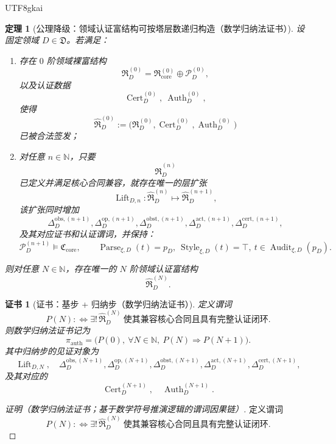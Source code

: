 \documentclass[12pt]{article}
\newtheorem{theorem}{定理}[section]
\newtheorem{Certificate}{证书}[section]
\newcommand{\NN}{\mathbb{N}}
\newcommand{\Parse}{\operatorname{Parse}}
\newcommand{\Audit}{\operatorname{Audit}}
\newcommand{\Cert}{\operatorname{Cert}}
\newcommand{\Auth}{\operatorname{Auth}}
\newcommand{\Style}{\operatorname{Style}}
\begin{document}
\begin{CJK*}{UTF8}{gkai}
\begin{theorem}[公理降级：领域认证富结构可按塔层数递归构造（数学归纳法证书）]
\label{thm:tex37-ch8-induction}
设固定领域 $D\in\mathfrak D$。若满足：
\begin{enumerate}
  \item 存在 $0$ 阶领域裸富结构
  \[
    \mathfrak R_D^{(0)}
    =
    \mathfrak R_{\mathrm{core}}^{(0)}
    \oplus
    \mathcal P_D^{(0)},
  \]
  以及认证数据
  \[
    \Cert_D^{(0)},\ \Auth_D^{(0)},
  \]
  使得
  \[
    \widehat{\mathfrak R}_D^{(0)}
    :=
    \bigl(
      \mathfrak R_D^{(0)},
      \Cert_D^{(0)},
      \Auth_D^{(0)}
    \bigr)
  \]
  已被合法签发；
  \item 对任意 $n\in\NN$，只要
  \[
    \widehat{\mathfrak R}_D^{(n)}
  \]
  已定义并满足核心合同兼容，就存在唯一的层扩张
  \[
    \operatorname{Lift}_{D,n}:
    \widehat{\mathfrak R}_D^{(n)}
    \mapsto
    \widehat{\mathfrak R}_D^{(n+1)},
  \]
  该扩张同时增加
  \[
    \Delta_D^{\mathrm{obs},(n+1)},
    \Delta_D^{\mathrm{op},(n+1)},
    \Delta_D^{\mathrm{obst},(n+1)},
    \Delta_D^{\mathrm{act},(n+1)},
    \Delta_D^{\mathrm{cert},(n+1)},
  \]
  及其对应证书和认证谓词，并保持：
  \[
    \mathcal P_D^{(n+1)}\models \mathfrak C_{\mathrm{core}},
    \qquad
    \Parse_{\xi,D}(t)=p_D,\ \Style_{\xi,D}(t)=\top,\ t\in\Audit_{\xi,D}(p_D).
  \]
\end{enumerate}
则对任意 $N\in\NN$，存在唯一的 $N$ 阶领域认证富结构
\[
  \widehat{\mathfrak R}_D^{(N)}.
\]
\end{theorem}

\begin{Certificate}[证书：基步 + 归纳步（数学归纳法证书）]
\label{cert:tex37-ch8-induction}
定义谓词
\[
  P(N)
  :
  \Longleftrightarrow
  \exists!\,\widehat{\mathfrak R}_D^{(N)}
  \ \text{使其兼容核心合同且具有完整认证闭环}.
\]
则数学归纳法证书记为
\[
  \pi_{\mathrm{auth}}
  =
  \bigl(
    P(0),\
    \forall N\in\NN,\ P(N)\Rightarrow P(N+1)
  \bigr).
\]
其中归纳步的见证对象为
\[
  \operatorname{Lift}_{D,N},
  \quad
  \Delta_D^{\mathrm{obs},(N+1)},
  \Delta_D^{\mathrm{op},(N+1)},
  \Delta_D^{\mathrm{obst},(N+1)},
  \Delta_D^{\mathrm{act},(N+1)},
  \Delta_D^{\mathrm{cert},(N+1)},
\]
及其对应的
\[
  \Cert_D^{(N+1)},
  \quad
  \Auth_D^{(N+1)}.
\]
\end{Certificate}

\begin{proof}[证明（数学归纳法证书；基于数学符号推演逻辑的谓词因果链）]
定义谓词
\[
  P(N)
  :
  \Longleftrightarrow
  \exists!\,\widehat{\mathfrak R}_D^{(N)}
  \ \text{使其兼容核心合同且具有完整认证闭环}.
\]


\end{proof}
\end{CJK*}
\end{document}
